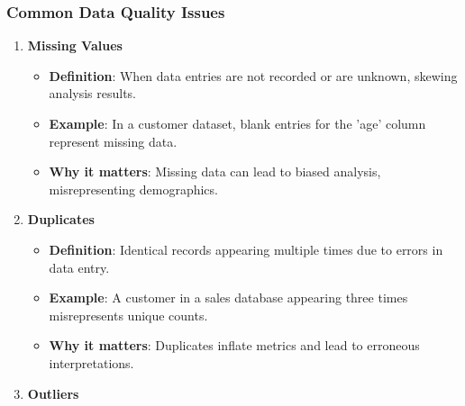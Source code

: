 \documentclass[aspectratio=169]{beamer}
\begin{document}
\begin{frame}[fragile]
    \frametitle{Common Data Quality Issues}
    \begin{enumerate}
        \item \textbf{Missing Values}  
            \begin{itemize}
                \item \textbf{Definition}: When data entries are not recorded or are unknown, skewing analysis results.
                \item \textbf{Example}: In a customer dataset, blank entries for the 'age' column represent missing data.
                \item \textbf{Why it matters}: Missing data can lead to biased analysis, misrepresenting demographics.
            \end{itemize}
        
        \item \textbf{Duplicates}  
            \begin{itemize}
                \item \textbf{Definition}: Identical records appearing multiple times due to errors in data entry.
                \item \textbf{Example}: A customer in a sales database appearing three times misrepresents unique counts.
                \item \textbf{Why it matters}: Duplicates inflate metrics and lead to erroneous interpretations.
            \end{itemize}
        
        \item \textbf{Outliers}  
    \end{enumerate}
\end{frame}
\end{document}
